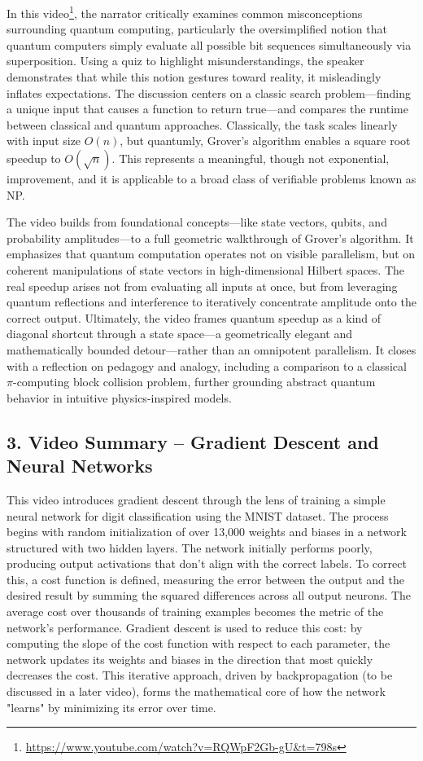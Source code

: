 \documentclass{article}
\theoremstyle{theorem}
\theoremstyle{definition}
\theoremstyle{remark}
\begin{document}
In this video\footnote{\url{https://www.youtube.com/watch?v=RQWpF2Gb-gU&t=798s}}, the narrator critically examines common misconceptions surrounding quantum computing, particularly the oversimplified notion that quantum computers simply evaluate all possible bit sequences simultaneously via superposition. Using a quiz to highlight misunderstandings, the speaker demonstrates that while this notion gestures toward reality, it misleadingly inflates expectations. The discussion centers on a classic search problem—finding a unique input that causes a function to return true—and compares the runtime between classical and quantum approaches. Classically, the task scales linearly with input size \(O(n)\), but quantumly, Grover's algorithm enables a square root speedup to \(O(\sqrt{n})\). This represents a meaningful, though not exponential, improvement, and it is applicable to a broad class of verifiable problems known as NP.

The video builds from foundational concepts—like state vectors, qubits, and probability amplitudes—to a full geometric walkthrough of Grover's algorithm. It emphasizes that quantum computation operates not on visible parallelism, but on coherent manipulations of state vectors in high-dimensional Hilbert spaces. The real speedup arises not from evaluating all inputs at once, but from leveraging quantum reflections and interference to iteratively concentrate amplitude onto the correct output. Ultimately, the video frames quantum speedup as a kind of diagonal shortcut through a state space—a geometrically elegant and mathematically bounded detour—rather than an omnipotent parallelism. It closes with a reflection on pedagogy and analogy, including a comparison to a classical $\pi$-computing block collision problem, further grounding abstract quantum behavior in intuitive physics-inspired models.

\subsection*{3. Video Summary – Gradient Descent and Neural Networks}

This video introduces gradient descent through the lens of training a simple neural network for digit classification using the MNIST dataset. The process begins with random initialization of over 13,000 weights and biases in a network structured with two hidden layers. The network initially performs poorly, producing output activations that don't align with the correct labels. To correct this, a cost function is defined, measuring the error between the output and the desired result by summing the squared differences across all output neurons. The average cost over thousands of training examples becomes the metric of the network’s performance. Gradient descent is used to reduce this cost: by computing the slope of the cost function with respect to each parameter, the network updates its weights and biases in the direction that most quickly decreases the cost. This iterative approach, driven by backpropagation (to be discussed in a later video), forms the mathematical core of how the network "learns" by minimizing its error over time.
\end{document}
